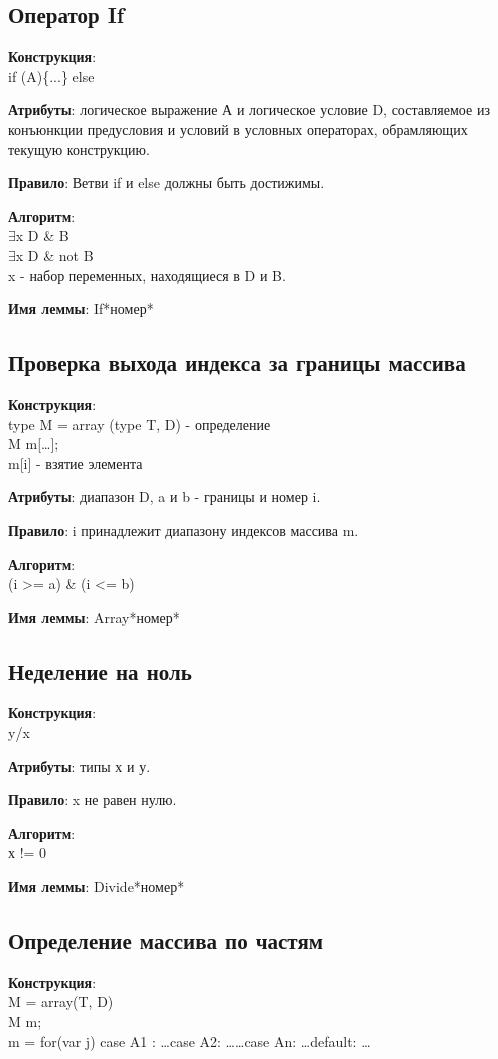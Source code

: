 \documentclass[12pt,a4paper]{article}
\begin{document}
\subsection{Оператор If}
\textbf{Конструкция}: \\
if (A)\{...\} else

\textbf{Атрибуты}: логическое выражение А и логическое условие D, составляемое из конъюнкции предусловия и условий в условных операторах, обрамляющих текущую конструкцию.

\textbf{Правило}: Ветви if и else  должны быть достижимы.

\textbf{Алгоритм}: \\
$\exists$x D \& B \\
$\exists$x D \& not B \\
x - набор переменных, находящиеся в D и B.

\textbf{Имя леммы}: If*номер*


\subsection{Проверка выхода индекса за границы массива}
\textbf{Конструкция}: \\
type M = array (type T, D)  - определение\\
M m[\dots]; \\
m[i] - взятие элемента

\textbf{Атрибуты}: диапазон D, a и b - границы и номер i.

\textbf{Правило}: i принадлежит диапазону индексов массива m.

\textbf{Алгоритм}: \\
(i >= a) \& (i <= b)

\textbf{Имя леммы}: Array*номер*


\subsection{Неделение на ноль}
\textbf{Конструкция}: \\
y/x

\textbf{Атрибуты}: типы х и у.

\textbf{Правило}: x не равен нулю.

\textbf{Алгоритм}: \\
х != 0

\textbf{Имя леммы}: Divide*номер*


\subsection{Определение массива по частям}
\textbf{Конструкция}: \\
M = array(T, D) \\
M m; \\
m = for(var j) { case A1 : \dots case A2: \dots \dots case An: \dots default: \dots }
\end{document}

